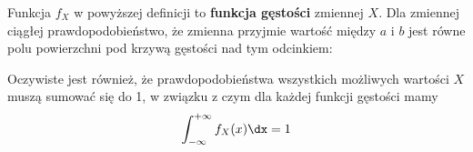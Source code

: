 Funkcja $f_X$ w powyższej definicji to \textbf{funkcja gęstości} zmiennej $X$. Dla zmiennej ciągłej prawdopodobieństwo, że zmienna przyjmie wartość między $a$ i $b$ jest równe polu powierzchni pod krzywą gęstości nad tym odcinkiem:

\begin{center}
\end{center}

Oczywiste jest również, że prawdopodobieństwa wszystkich możliwych wartości $X$ muszą sumować się do 1, w związku z czym dla każdej funkcji gęstości mamy
$$\int_{-\infty}^{+\infty} f_X(x) \dx = 1$$

